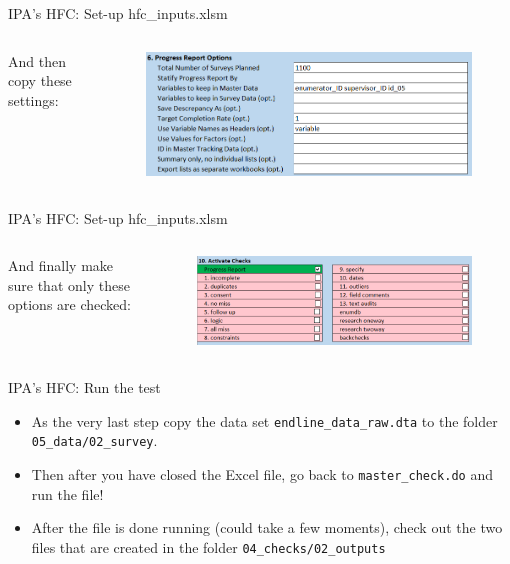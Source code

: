 \documentclass[aspectratio=169]{beamer}
\begin{document}
\begin{frame}{IPA's HFC: Set-up hfc\_inputs.xlsm}
	\begin{columns}[c]
		
		\small And then copy these settings:
		
		\begin{figure}
			\centering
			\includegraphics[width=\linewidth]{img/ipacheck-setup-3.png}
		\end{figure}
	\end{columns}
\end{frame}

\begin{frame}{IPA's HFC: Set-up hfc\_inputs.xlsm}
	\begin{columns}[c]
		
		\column{.22\linewidth}
		\small And finally make sure that only these options are checked:
		
		\column{.78\linewidth}
		\begin{figure}
			\centering
			\includegraphics[width=\linewidth]{img/ipacheck-setup-4.png}
		\end{figure}
	\end{columns}
\end{frame}

\begin{frame}{IPA's HFC: Run the test}

	\begin{itemize}
		\item As the very last step copy the data set \texttt{endline\_data\_raw.dta} to the folder \texttt{05\_data/02\_survey}. 
		\item Then after you have closed the Excel file, go back to \texttt{master\_check.do} and run the file!
		\item After the file is done running (could take a few moments), check out the two files that are created in the folder \texttt{04\_checks/02\_outputs}
	\end{itemize}
\end{frame}
\end{document}
